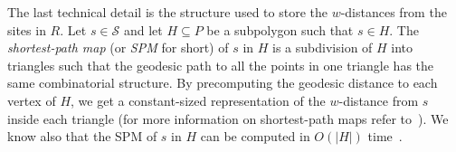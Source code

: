 \documentclass[a4paper, 11pt]{article}
\newcommand{\s}{\mathcal S}
\newcommand{\funnel}[2][P]{\ensuremath{\mathtt{Funnel}_{\scriptscriptstyle #1}(#2)}}
\newcommand{\cell}[2][P]{\ensuremath{\mathtt{Cell}_{\scriptscriptstyle #1}(#2)}}
\newcommand{\bcell}[2][P]{\ensuremath{\mathtt{bCell}_{\scriptscriptstyle #1}(#2)}}
\newcommand{\red}{\color{red}}
\newcommand{\marrow}{\marginpar[\hfill$\longrightarrow$]{$\longleftarrow$}}
\newcommand{\luis}[1]{{\red \textsc{Luis:} \marrow\textsf{#1}}}
\begin{document}
%
%

The last technical detail is the structure used to store the $w$-distances from the sites in $R$.
Let $s\in \s$ and let $H\subseteq P$ be a subpolygon such that $s\in H$.
The \emph{shortest-path map} (or \emph{SPM} for short) of $s$ in $H$ is a subdivision of $H$ into triangles such that the geodesic path to all the points in one triangle has the same combinatorial structure. 
By precomputing the geodesic distance to each vertex of $H$, we get a constant-sized representation of the $w$-distance from $s$ inside each triangle (for more information on shortest-path maps refer to~\cite{guibasShortestPathTree}). We know also that the SPM of $s$ in $H$ can be computed in $O(|H|)$ time~\cite{chazelle1991triangulating,guibasShortestPathTree}. 
\end{document}
